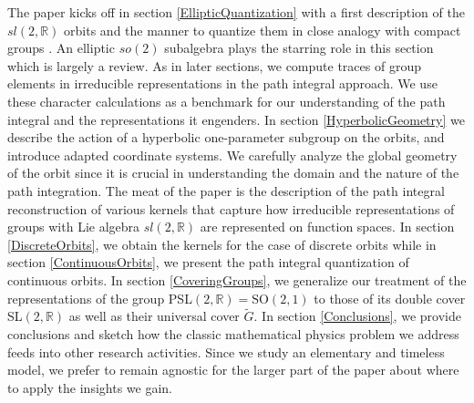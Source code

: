 \documentclass[12pt]{article}
\numberwithin{equation}{section}
\numberwithin{equation}{section}
\numberwithin{table}{section}\setlength{\multlinegap}{25pt}
\begin{document}
The paper kicks off in section \ref{EllipticQuantization} with a first description of the $sl(2,\mathbb{R})$  orbits and the manner to quantize them in close analogy with compact groups \cite{Vergne,Witten:1987ty}.
An elliptic $so(2)$ subalgebra plays the starring role in this section which is largely a review.  As in later sections, we compute traces of group elements in irreducible representations in the path integral approach. We  use these character calculations as a benchmark for our understanding of the path integral and the representations it engenders. In section \ref{HyperbolicGeometry} we describe the action of a hyperbolic one-parameter subgroup on the orbits, and introduce adapted coordinate systems. We carefully analyze the global geometry of the orbit since it is crucial in understanding the domain and the nature of the path integration.  The meat of the paper is the description of the path integral reconstruction of various kernels that capture how irreducible representations of groups with Lie algebra $sl(2,\mathbb{R})$ are represented on function spaces. In section \ref{DiscreteOrbits}, we obtain the kernels for the case of discrete orbits while in section \ref{ContinuousOrbits}, we present the path integral quantization of continuous orbits.  In section \ref{CoveringGroups}, we generalize our treatment of the representations of the group PSL$(2,\mathbb{R})=\mathrm{SO}(2,1)$  to those of its double cover SL$(2,\mathbb{R})$ as well as their universal cover $\widetilde{G}$.  In section \ref{Conclusions}, we provide conclusions and sketch how the classic mathematical physics problem we address feeds into other research activities. Since we study an elementary
and timeless model, we prefer to remain agnostic  for the larger part of the paper about where to apply the  insights we gain.
\end{document}
